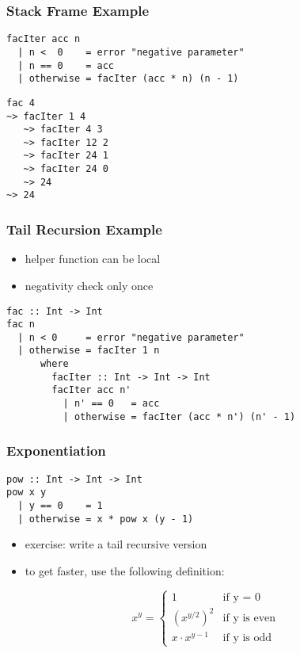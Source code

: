 \documentclass[dvipsnames]{beamer}
\theoremstyle{plain}
\begin{document}
\begin{frame}[fragile]
  \frametitle{Stack Frame Example}

  \begin{exampleblock}{}
  \begin{lstlisting}
facIter acc n
  | n <  0    = error "negative parameter"
  | n == 0    = acc
  | otherwise = facIter (acc * n) (n - 1)
  \end{lstlisting}

    \begin{lstlisting}[frame=single]
fac 4
~> facIter 1 4
   ~> facIter 4 3
   ~> facIter 12 2
   ~> facIter 24 1
   ~> facIter 24 0
   ~> 24
~> 24
    \end{lstlisting}
  \end{exampleblock}
\end{frame}

\begin{frame}[fragile]
  \frametitle{Tail Recursion Example}

  \begin{itemize}
    \item helper function can be local
    \item negativity check only once
  \end{itemize}

  \begin{lstlisting}
fac :: Int -> Int
fac n
  | n < 0     = error "negative parameter"
  | otherwise = facIter 1 n
      where
        facIter :: Int -> Int -> Int
        facIter acc n'
          | n' == 0   = acc
          | otherwise = facIter (acc * n') (n' - 1)
  \end{lstlisting}
\end{frame}

\begin{frame}[fragile]
  \frametitle{Exponentiation}

  \begin{lstlisting}
pow :: Int -> Int -> Int
pow x y
  | y == 0    = 1
  | otherwise = x * pow x (y - 1)
  \end{lstlisting}

  \pause
  \begin{itemize}
    \item exercise: write a tail recursive version
  \end{itemize}

  \pause
  \begin{itemize}
    \item to get faster, use the following definition:
  \end{itemize}
  \[
    x^y =
      \begin{cases}
        1               & \mbox{if y = 0}\\
        {(x^{y/2})}^2   & \mbox{if y is even}\\
        x \cdot x^{y-1} & \mbox{if y is odd}
      \end{cases}
  \]
\end{frame}
\end{document}
